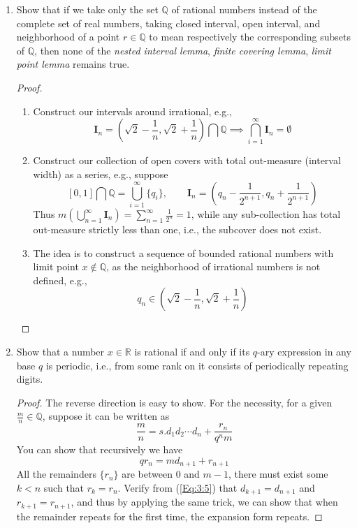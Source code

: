 \begin{enumerate}
\begin{proof}[Solution.]
\end{proof}
\item
Show that if we take only the set $\mathbb{Q}$ of rational numbers instead of the complete set of real numbers, taking closed interval, open interval, and neighborhood of a point $r\in\mathbb{Q}$ to mean respectively the corresponding subsets of $\mathbb{Q}$, then none of the \emph{nested interval lemma}, \emph{finite covering lemma}, \emph{limit point lemma} remains true.
\begin{proof}
\begin{enumerate}
\item
Construct our intervals around irrational, e.g.,
\[
\bm I_n = \left(\sqrt{2} - \frac{1}{n},\sqrt{2}+\frac{1}{n}\right)\bigcap\mathbb{Q}\implies
\bigcap_{i=1}^\infty \bm I_n=\emptyset
\]
\item
Construct our collection of open covers with total out-measure (interval width) as a series, e.g., suppose
\[
[0,1]\bigcap\mathbb{Q}=\bigcup_{i=1}^\infty\{q_i\},\qquad
\bm I_n = \left(q_n-\frac{1}{2^{n+1}},q_n+\frac{1}{2^{n+1}}\right)
\]
Thus $m(\bigcup_{n=1}^\infty \bm I_n)=\sum_{n=1}^\infty\frac{1}{2^n}=1$, while any sub-collection has total out-measure strictly less than one, i.e., the subcover does not exist.
\item
The idea is to construct a sequence of bounded rational numbers with limit point $x\notin\mathbb{Q}$, as the neighborhood of irrational numbers is not defined, e.g.,
\[
q_n\in\left(\sqrt{2}-\frac{1}{n},\sqrt{2}+\frac{1}{n}\right)
\]
\end{enumerate}
\end{proof}
\item
Show that a number $x\in\mathbb{R}$ is rational if and only if its $q$-ary expression in any base $q$ is periodic, i.e., from some rank on it consists of periodically repeating digits.
\begin{proof}
The reverse direction is easy to show. For the necessity, for a given $\frac{m}{n}\in\mathbb{Q}$, suppose it can be written as
\[
\frac{m}{n} = s.d_1d_2\cdots d_n+\frac{r_n}{q^n m}
\]
You can show that recursively we have
\begin{equation}\label{Eq:3:5}
qr_n = md_{n+1} + r_{n+1}
\end{equation}
All the remainders $\{r_{n}\}$ are between $0$ and $m-1$, there must exist some $k<n$ such that $r_k=r_n$. Verify from (\ref{Eq:3:5}) that $d_{k+1} = d_{n+1}$ and $r_{k+1} = r_{n+1}$, and thus by applying the same trick, we can show that when the remainder repeats for the first time, the expansion form repeats.
\end{proof}




\end{enumerate}